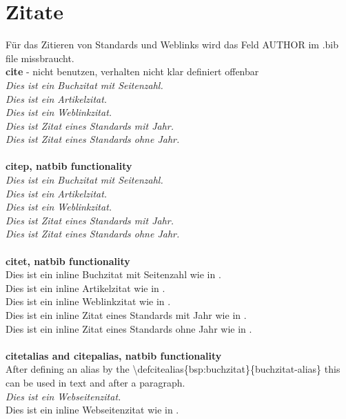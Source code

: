 \section{Zitate} \label{hdl:konstrukte_zitate}
Für das Zitieren von Standards und Weblinks wird das Feld AUTHOR im .bib file missbraucht.\\
\textbf{cite} - nicht benutzen, verhalten nicht klar definiert offenbar\\
\textit{\glqq Dies ist ein Buchzitat mit Seitenzahl.\grqq}\cite[S.92ff.]{bsp:buchzitat}\\
\textit{\glqq Dies ist ein Artikelzitat.\grqq}\cite{bsp:artikelzitat}\\
\textit{\glqq Dies ist ein Weblinkzitat.\grqq}\cite{bsp:weblinkzitat}\\
\textit{\glqq Dies ist Zitat eines Standards mit Jahr.\grqq}\cite{bsp:techspec}\\
\textit{\glqq Dies ist Zitat eines Standards ohne Jahr.\grqq}\citeauthor{bsp:techspec}\\
\textbf{\\citep, natbib functionality}\\
\textit{\glqq Dies ist ein Buchzitat mit Seitenzahl.\grqq}\citep[S.92ff.]{bsp:buchzitat}\\
\textit{\glqq Dies ist ein Artikelzitat.\grqq}\citep{bsp:artikelzitat}\\
\textit{\glqq Dies ist ein Weblinkzitat.\grqq}\citep{bsp:weblinkzitat}\\
\textit{\glqq Dies ist Zitat eines Standards mit Jahr.\grqq}\citep{bsp:techspec}\\
\textit{\glqq Dies ist Zitat eines Standards ohne Jahr.\grqq}\\
\textbf{\\citet, natbib functionality}\\
Dies ist ein inline Buchzitat mit Seitenzahl wie in \citet[S.92ff.]{bsp:buchzitat}.\\
Dies ist ein inline Artikelzitat wie in \citet{bsp:artikelzitat}.\\
Dies ist ein inline Weblinkzitat wie in \citet{bsp:weblinkzitat}.\\
Dies ist ein inline Zitat eines Standards mit Jahr wie in \citet{bsp:techspec}.\\
Dies ist ein inline Zitat eines Standards ohne Jahr wie in .\\
\textbf{\\citetalias and citepalias, natbib functionality}\\
After defining an alias by the \textbackslash defcitealias\{bsp:buchzitat\}\{buchzitat-alias\} this can be used in text and after a paragraph.\\
\textit{\glqq Dies ist ein Webseitenzitat.\grqq}\\
Dies ist ein inline Webseitenzitat wie in .\\
\clearpage

